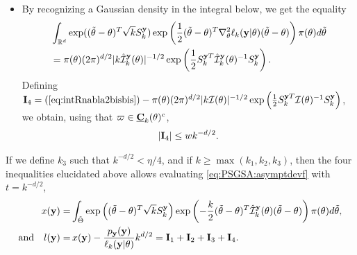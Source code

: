 \begin{proofb}
\begin{itemize}
            \begin{align}   
                 |\hat h_{\mbf y}(\tilde\theta,\theta,\theta') - \hat h_{\mbf y}(\tilde\theta,\theta,\theta) | 
                    \leq \hat h_{\mbf y}(\tilde\theta,\theta,\theta')\left|\exp\left( -\frac{k}{2}(\tilde\theta-\theta)^T(\hat\cI_k^{\mbf y}(\theta')-\hat\cI_k^{\mbf y}(\theta))(\tilde\theta-\theta) \right)-1\right|.
            \end{align}
        Thus, if $k\geq k_2$ where $k_2$ is such that $\tilde R_{k_2}<\tilde\tau$, we obtain $(\tilde\theta-\theta)^T(\hat\cI_k^{\mbf y}(\theta')-\hat\cI_k^{\mbf y}(\theta))(\tilde\theta-\theta) < u$ consequently to $\mbf y=\mbf Y_k(\varpi)$ with $\varpi\in\underline{\mbf D}_k(\theta)^c$. 
        It then comes $|\mbf I_3|< w k^{-d/2}$.

        \item  By recognizing a Gaussian density in the integral below, we get the equality 
        \begin{align}
        \nonumber
            &\int_{\mathbb{R}^d}\exp((\tilde\theta-\theta)^T\sqrt{k}S_k^{\mathbf{y}})\exp\left(\frac{1}{2}(\tilde\theta-\theta)^T\nabla_\theta^2\ell_k(\mathbf{y}|\theta)(\tilde\theta-\theta)\right)\pi(\theta)d\tilde\theta \\
            &=
            \pi(\theta)(2\pi)^{d/2}|k\hat{\mathcal{I}}_k^{\mathbf{y}}(\theta)|^{-1/2}\exp\left(\frac{1}{2}S_k^{\mathbf{y} T}\hat{\mathcal{I}}_k^{\mathbf{y}}(\theta)^{-1}S_k^{\mathbf{y}}\right).
            \label{eq:intRnabla2bisbis}
        \end{align}
        Defining $\mathbf{I}_4= (\ref{eq:intRnabla2bisbis}) - \pi(\theta)(2\pi)^{d/2}|k\mathcal{I}(\theta)|^{-1/2}\exp\left(\frac{1}{2}S_k^{\mathbf{y}T}\mathcal{I}(\theta)^{-1}S_k^{\mathbf{y}}\right)$, we obtain,
        using that $\varpi\in \underline{\mathbf{C}}_k(\theta)^c$, 
        \begin{equation}
            |\mbf I_4|  %
            \leq w k^{-d/2}.
        \end{equation}
    \end{itemize}

If we define $k_3$ such that $k^{-d/2}<\eta/4$, and if $k\geq\max(k_1,k_2,k_3)$, then the four inequalities elucidated above allows evaluating \cref{eq:PSGSA:asymptdevf} with $t=k^{-d/2}$,
\begin{equation}
    \begin{aligned}
    x(\mathbf{y}) = & \int_{\tilde\Theta} \exp\left((\tilde\theta-\theta)^T\sqrt{k}S_k^{\mathbf{y}}\right)\exp\left( -\frac{k}{2}(\tilde\theta-\theta)^T\hat{\mathcal{I}}_k^{\mathbf{y}}(\theta)(\tilde\theta-\theta) \right)\pi(\theta )d\tilde\theta,\\
        \text{and}\quad l(\mathbf{y}) =&\, x(\mathbf{y})-\frac{p_{\mathbf{y}}(\mathbf{y})}{\ell_k(\mathbf{y}|\theta)}k^{d/2} = \mathbf{I}_1+\mathbf{I}_2+\mathbf{I}_3+\mathbf{I}_4.
    \end{aligned}
\end{equation}


\end{proofb}
